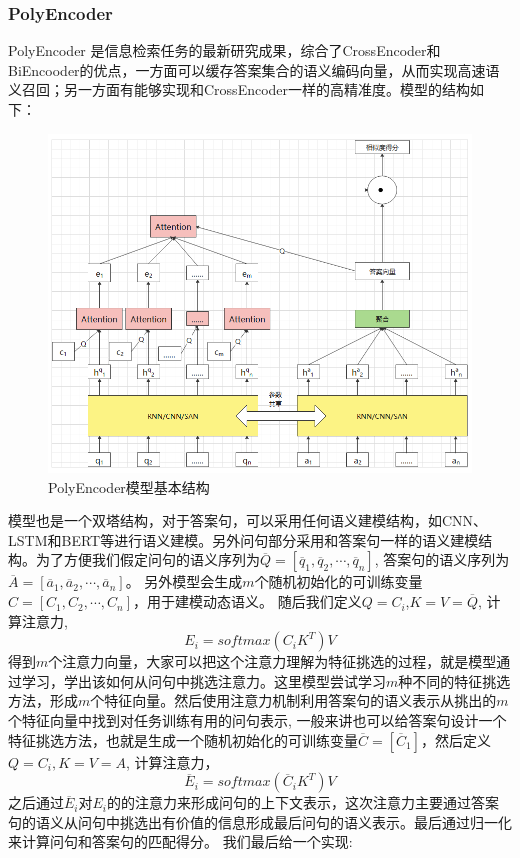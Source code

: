 \documentclass[twoside,a4paper,12pt]{book}%
\begin{document}
\subsubsection{PolyEncoder}
PolyEncoder 是信息检索任务的最新研究成果，综合了CrossEncoder和BiEncooder的优点，一方面可以缓存答案集合的语义编码向量，从而实现高速语义召回；另一方面有能够实现和CrossEncoder一样的高精准度。模型的结构如下：
\begin{figure}[H]
\begin{center}
\includegraphics[width=6.0in]{figures/polyencoder1.png}
\caption{PolyEncoder模型基本结构}
\label{fig:polyencoder1}
\end{center}
\end{figure}
模型也是一个双塔结构，对于答案句，可以采用任何语义建模结构，如\gls{CNN}、\gls{LSTM}和\gls{BERT}等进行语义建模。另外问句部分采用和答案句一样的语义建模结构。为了方便我们假定问句的语义序列为$\overline{Q}=[\overline{q}_1,\overline{q}_2,\cdots, \overline{q}_n]$, 答案句的语义序列为$\overline{A}=[\overline{a}_1,\overline{a}_2,\cdots, \overline{a}_n]$。
另外模型会生成$m$个随机初始化的可训练变量$C=[C_1,C_2,\cdots,C_n]$，用于建模动态语义。
随后我们定义$Q=C_i$,$K=V=\overline{Q}$, 计算注意力,
$$
E_i = softmax(C_iK^T)V
$$
得到$m$个注意力向量，大家可以把这个注意力理解为特征挑选的过程，就是模型通过学习，学出该如何从问句中挑选注意力。这里模型尝试学习$m$种不同的特征挑选方法，形成$m$个特征向量。然后使用注意力机制利用答案句的语义表示从挑出的$m$个特征向量中找到对任务训练有用的问句表示, 一般来讲也可以给答案句设计一个特征挑选方法，也就是生成一个随机初始化的可训练变量$\overline{C}=[\overline{C}_1]$，然后定义$Q=C_i,K=V=A$, 计算注意力，
$$
\overline{E}_i = softmax(\overline{C}_iK^T)V
$$
之后通过$\overline{E}_i$对$E_i$的的注意力来形成问句的上下文表示，这次注意力主要通过答案句的语义从问句中挑选出有价值的信息形成最后问句的语义表示。最后通过归一化来计算问句和答案句的匹配得分。
我们最后给一个实现:
\end{document}
